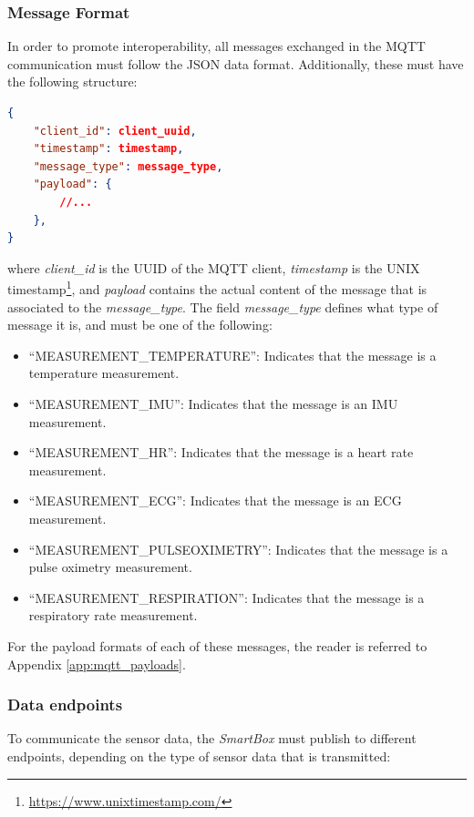 \subsubsection{Message Format}
\label{sec:mqtt payload format}
In order to promote interoperability, all messages exchanged in the \acs{MQTT} communication must follow the \acs{JSON} data format. Additionally, these must have the following structure:

\begin{lstlisting}[language=json]
{
    "client_id": client_uuid, 
    "timestamp": timestamp,
    "message_type": message_type,
    "payload": {
        //...
    }, 
}  
\end{lstlisting}

where \textit{client\_id} is the \acs{UUID} of the \acs{MQTT} client, \textit{timestamp} is the UNIX timestamp\footnote{\url{https://www.unixtimestamp.com/}}, and \textit{payload} contains the actual content of the message that is associated to the \textit{message\_type}. The field \textit{message\_type} defines what type of message it is, and must be one of the following:

\begin{itemize}
    \item ``MEASUREMENT\_TEMPERATURE'': Indicates that the message is a temperature measurement.
    \item ``MEASUREMENT\_IMU'': Indicates that the message is an \acs{IMU} measurement.
    \item ``MEASUREMENT\_HR'': Indicates that the message is a heart rate measurement.
    \item ``MEASUREMENT\_ECG'': Indicates that the message is an \acs{ECG} measurement.
    \item ``MEASUREMENT\_PULSEOXIMETRY'': Indicates that the message is a pulse oximetry measurement.
    \item ``MEASUREMENT\_RESPIRATION'': Indicates that the message is a respiratory rate measurement.
\end{itemize}

For the payload formats of each of these messages, the reader is referred to Appendix \ref{app:mqtt_payloads}.

\subsubsection{Data endpoints}
To communicate the sensor data, the \textit{SmartBox} must publish to different endpoints, depending on the type of sensor data that is transmitted:

